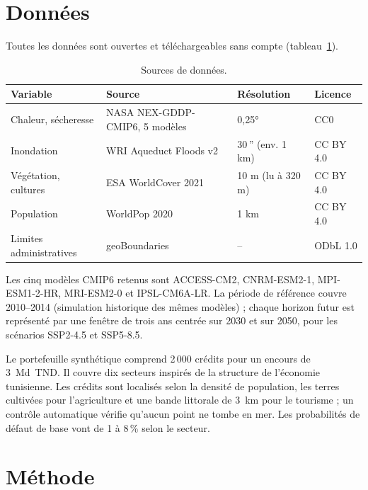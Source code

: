 \documentclass[11pt,a4paper]{article}
\begin{document}
\section{Données}\label{sec:donnees}

Toutes les données sont ouvertes et téléchargeables sans compte (tableau~\ref{tab:donnees}).

\begin{table}[ht]
\centering\small
\caption{Sources de données.}\label{tab:donnees}
\begin{tabular}{@{}p{3.0cm}p{5.2cm}p{2.3cm}p{2.6cm}@{}}
\toprule
Variable & Source & Résolution & Licence \\
\midrule
Chaleur, sécheresse & NASA NEX-GDDP-CMIP6, 5 modèles \citep{thrasher2022} & 0,25° & CC0 \\
Inondation & WRI Aqueduct Floods v2 \citep{ward2020} & 30\,'' (env. 1 km) & CC BY 4.0 \\
Végétation, cultures & ESA WorldCover 2021 \citep{zanaga2022} & 10 m (lu à 320 m) & CC BY 4.0 \\
Population & WorldPop 2020 \citep{tatem2017} & 1 km & CC BY 4.0 \\
Limites administratives & geoBoundaries \citep{runfola2020} & -- & ODbL 1.0 \\
\bottomrule
\end{tabular}
\end{table}

Les cinq modèles CMIP6 retenus sont ACCESS-CM2, CNRM-ESM2-1, MPI-ESM1-2-HR, MRI-ESM2-0 et IPSL-CM6A-LR. La période de référence couvre 2010--2014 (simulation historique des mêmes modèles) ; chaque horizon futur est représenté par une fenêtre de trois ans centrée sur 2030 et sur 2050, pour les scénarios SSP2-4.5 et SSP5-8.5.

Le portefeuille synthétique comprend 2\,000 crédits pour un encours de 3~Md~TND. Il couvre dix secteurs inspirés de la structure de l'économie tunisienne. Les crédits sont localisés selon la densité de population, les terres cultivées pour l'agriculture et une bande littorale de 3~km pour le tourisme ; un contrôle automatique vérifie qu'aucun point ne tombe en mer. Les probabilités de défaut de base vont de 1 à 8\,\% selon le secteur.

\section{Méthode}\label{sec:methode}
\end{document}

